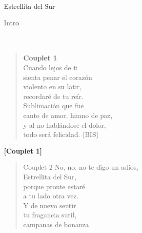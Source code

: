 \begin{song}[vals]{Estrellita del Sur}
\begin{instrumental}{Intro}
\\
\\
\measure{}\\
\end{instrumental}
\begin{verse}{}
\hspace{-2.5em}\textbf{Couplet 1}\\
Cuando lejos de ti\\
sienta penar el corazón\\
violento en su latir,\\
recordaré de tu reír.\\
Sublimación que fue\\
canto de amor, himno de paz,\\
y al no hablándose el dolor,\\
todo será felicidad. (BIS)\hspace{3em}\\
\end{verse}
\textbf{[Couplet 1]}\\
\begin{verse}{Couplet 2}
No, no, no te digo un adíos,\hspace{1em}\hspace{7.5em}\\
Estrellita del Sur,\\
porque pronte estaré\\
a tu lado otra vez.\\
\hspace{0.8em}Y de nuevo sentir\\
tu fragancia sutil,\\
campanas de bonanza\\

\end{verse}
\end{song}
